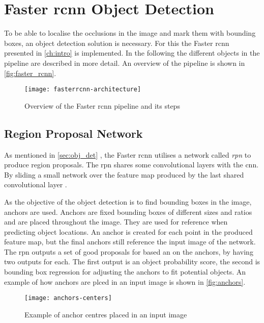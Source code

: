 \section{Faster \gls{rcnn} Object Detection}
To be able to localise the occlusions in the image and mark them with bounding boxes, an object detection solution is necessary. For this the Faster \gls{rcnn} presented in \autoref{ch:intro} is implemented. In the following the different objects in the pipeline are described in more detail. An overview of the pipeline is shown in \autoref{fig:faster_rcnn}.

\begin{figure}[H]
	\centering
	\texttt{[image: fasterrcnn-architecture]}
	\caption{Overview of the Faster \gls{rcnn} pipeline and its steps \citep{Rey2018}}
	\label{fig:faster_rcnn}
\end{figure}


\subsection{Region Proposal Network}
As mentioned in \autoref{sec:obj_det} , the Faster \gls{rcnn} utilises a network called \textit{\gls{rpn}} to produce region proposals. The \gls{rpn} shares some convolutional layers with the \gls{cnn}. By sliding a small network over the feature map produced by the last shared convolutional layer \citep{Ren2017}.

As the objective of the object detection is to find bounding boxes in the image, anchors are used. Anchors are fixed bounding boxes of different sizes and ratios and are placed throughout the image. They are used for reference when predicting object locations. An anchor is created for each point in the produced feature map, but the final anchors still reference the input image of the network. The \gls{rpn} outputs a set of good proposals for based an on the anchors, by having two outputs for each. The first output is an object probability score, the second is bounding box regression for adjusting the anchors to fit potential objects. An example of how anchors are plced in an input image is shown in \autoref{fig:anchors}.

\begin{figure}[H]
	\centering
	\texttt{[image: anchors-centers]}
	\caption{Example of anchor centres placed in an input image \citep{Rey2018}}
	\label{fig:anchors}
\end{figure}

